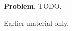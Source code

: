 \newpage
{}
\label{cap:bad-chapter}

\begin{tcolorbox}
\textbf{Problem.}
TODO.
\end{tcolorbox}

\begin{remark*}
Earlier material only.
\end{remark*}

\clearpage
